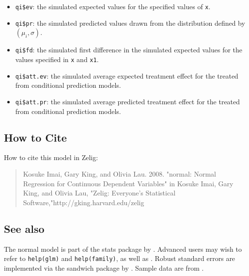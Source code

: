 \documentclass{article}
\begin{document}
\begin{itemize}
   \begin{itemize}
   \item {\tt qi\$ev}: the simulated expected values for the specified
     values of {\tt x}.
   \item {\tt qi\$pr}: the simulated predicted values drawn from the
     distribution defined by $(\mu_i, \sigma)$.
   \item {\tt qi\$fd}: the simulated first difference in the simulated
     expected values for the values specified in {\tt x} and {\tt x1}.
   \item {\tt qi\$att.ev}: the simulated average expected treatment
     effect for the treated from conditional prediction models.  
   \item {\tt qi\$att.pr}: the simulated average predicted treatment
     effect for the treated from conditional prediction models.  
   \end{itemize}
\end{itemize}

\subsection* {How to Cite} 

How to cite this model in Zelig:
\begin{verse}
  Kosuke Imai, Gary King, and Olivia Lau. 2008. "normal: Normal Regression for Continuous Dependent Variables" in Kosuke Imai, Gary King, and Olivia Lau, "Zelig: Everyone's Statistical Software,"http://gking.harvard.edu/zelig
\end{verse}

\CiteZelig

\subsection* {See also}

The normal model is part of the stats package by \citet{VenRip02}.
Advanced users may wish to refer to \texttt{help(glm)} and
\texttt{help(family)}, as well as \cite{McCNel89}. Robust standard
errors are implemented via the sandwich package by \citet{Zeileis04}.
Sample data are from \cite{KinTomWit00}.



 
\end{document}
